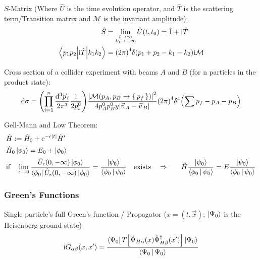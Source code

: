 		\noindent
		$S$-Matrix (Where $\hat{U}$ is the time evolution operator, and $\hat{T}$ is the scattering term/Transition matrix and $\mathcal{M}$ is the invariant amplitude):
		\begin{equation}
			\begin{aligned}
				\hat{S} &= \lim_{\substack{t\rightarrow\infty\\t_0\rightarrow-\infty}} \hat{U}(t,t_0) = \hat{1} + \mathrm{i} \hat{T} \\
				\mel**{p_{1}p_{2}}{\mathrm{i} \hat{T}}{k_{1}k_{2}} &= \qty(2\pi)^4\delta(p_1 + p_2 - k_1 - k_2) \mathrm{i} \mathcal{M} \\
			\end{aligned}
		\end{equation}

		\noindent
		Cross section of a collider experiment with beams $A$ and $B$ (for n particles in the product state):
		\begin{equation}
			\dd \sigma = \qty(\prod_{i=1}^{n} \frac{\dd^3 \vec{p}_i}{2 \pi^3} \frac{1}{2 p_i^0}) \frac{\abs{\mathcal{M}(p_A,p_B\rightarrow\set{p_f})}^2}{4p_A^0 p_B^0 y\abs{\vec{v}_A - \vec{v}_B}}  \qty(2\pi)^4 \delta^4 \qty(\sum p_{f} - p_A - p_B)
		\end{equation} 

		\noindent
		Gell-Mann and Low Theorem:
		\begin{equation}
			\begin{aligned}
				&\hat{H} := \hat{H}_0 + \mathrm{e}^{-\epsilon \abs{t}} \hat{H}' \\
				&\hat{H}_0 \Ket{\phi_0} = E_0 + \Ket{\phi_0} \\
				&\text{if}\quad \lim_{\epsilon\rightarrow 0} \frac{\hat{U}_\epsilon(0,-\infty)\Ket{\phi_0}}{\Bra{\phi_0} \hat{U}_\epsilon(0,-\infty)\Ket{\phi_0}}
				= \frac{\Ket{\psi_0}}{\Braket{\phi_0|\psi_0}} \quad\text{exists}\quad
				\Rightarrow&\quad \hat{H} \frac{\Ket{\psi_0}}{\Braket{\phi_0|\psi_0}} = E \frac{\Ket{\psi_0}}{\Braket{\phi_0|\psi_0}} \\
			\end{aligned}
		\end{equation}

		\subsubsection{Green's Functions}
			Single particle's full Green's function / Propagator  ($x=(t,\vec{x})$; $\Ket{\Psi_0}$ is the Heisenberg ground state)
			\begin{equation}
				\begin{aligned}
					\mathrm{i} G_{\alpha\beta}(x, x') &= \frac{\Bra{\Psi_0} T\qty[\hat{\Psi}_{H\alpha}(x)\hat{\Psi}^\dagger_{H\beta}(x')] \Ket{\Psi_0}}{\Braket{\Psi_0|\Psi_0}} \\					
				\end{aligned}
			\end{equation}


